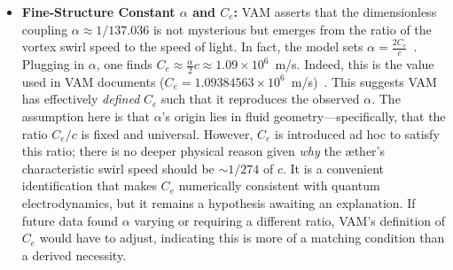 \documentclass[a4paper,12pt]{article}
\begin{document}
\begin{itemize}
        \item \textbf{Fine-Structure Constant $\alpha$ and $C_e$:} VAM asserts that the dimensionless coupling $\alpha \approx 1/137.036$ is not mysterious but emerges from the ratio of the vortex swirl speed to the speed of light. In fact, the model sets $\alpha = \frac{2C_e}{c}$~\cite{vamalpha}. Plugging in $\alpha$, one finds $C_e \approx \frac{\alpha}{2}c \approx 1.09\times10^6$~m/s. Indeed, this is the value used in VAM documents ($C_e=1.09384563\times10^6$~m/s)~\cite{vamunits}. This suggests VAM has effectively \emph{defined} $C_e$ such that it reproduces the observed $\alpha$. The assumption here is that $\alpha$’s origin lies in fluid geometry---specifically, that the ratio $C_e/c$ is fixed and universal. However, $C_e$ is introduced ad hoc to satisfy this ratio; there is no deeper physical reason given \emph{why} the æther’s characteristic swirl speed should be $\sim 1/274$ of $c$. It is a convenient identification that makes $C_e$ numerically consistent with quantum electrodynamics, but it remains a hypothesis awaiting an explanation. If future data found $\alpha$ varying or requiring a different ratio, VAM’s definition of $C_e$ would have to adjust, indicating this is more of a matching condition than a derived necessity.






\end{itemize}
\end{document}
